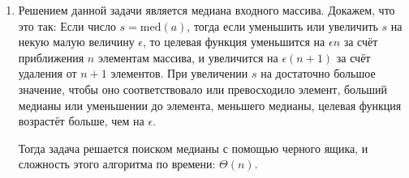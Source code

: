 \documentclass{article}
\begin{document}
\begin{enumerate}
\begin{lstlisting}[language=Python]
    if cur_segment_start is not None:
        answer.append((cur_segment_start, ends[-1][0]))

    return answer
          \end{lstlisting}

          Доказательство:

          Этот алгоритм корректен, так как для каждой точки
          множества он хранит точное число покрывающих ее отрезков.

          Оценка:

          Сложность этого алгоритма по времени: $\Theta(n \log n)$,
          так как он один раз проходится по каждому из $2n$ концов
          отрезков, предварительно их отсортировав. Сложность
          алгоритма по памяти: $\Theta(n)$, так как он создаёт
          дополнительный массив из концов, и его размер линейно
          зависит от размера входного массива.

    \item Решением данной задачи является медиана входного массива.
          Докажем, что это так: Если число $s = \mathrm{med}(a)$, тогда
          если уменьшить или увеличить $s$ на некую малую величину
          $\epsilon$, то целевая функция уменьшится на $\epsilon n$
          за счёт приближения $n$ элементам массива, и увеличится на
          $\epsilon (n + 1)$ за счёт удаления от $n + 1$ элементов.
          При увеличении $s$ на достаточно большое значение, чтобы
          оно соответствовало или превосходило элемент, больший
          медианы или уменьшении до элемента, меньшего медианы,
          целевая функция возрастёт больше, чем на $\epsilon$.

          Тогда задача решается поиском медианы с помощью черного
          ящика, и сложность этого алгоритма по времени: $\Theta(n)$.
\end{enumerate}
\end{document}
